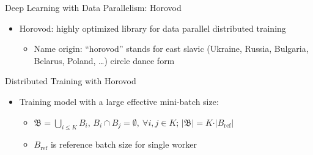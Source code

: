 \begin{frame}{Deep Learning with Data Parallelism: Horovod}
\protect\hypertarget{deep-learning-with-data-parallelism-horovod-2}{}

\begin{itemize}
\tightlist
\item
  Horovod: highly optimized library for data parallel distributed
  training

  \begin{itemize}
  \tightlist
  \item
    Name origin: ``horovod'' stands for east slavic (Ukraine, Russia,
    Bulgaria, Belarus, Poland, \ldots{}) circle dance form
  \end{itemize}
\end{itemize}


\end{frame}

\begin{frame}{Distributed Training with Horovod}
\protect\hypertarget{distributed-training-with-horovod}{}

\begin{itemize}
\tightlist
\item
  Training model with a large effective mini-batch size:

  \begin{itemize}
  \tightlist
  \item
    \(\mathfrak{B} = \bigcup_{i \le K} B_i\),
    \(B_i \cap B_j = \emptyset,\ \forall i,j \in K\);
    \(\vert \mathfrak{B} \vert = K \cdot \vert B_{\text{ref}} \vert\)
  \item
    \(B_{\text{ref}}\) is reference batch size for single worker
  \end{itemize}
\end{itemize}


\end{frame}

